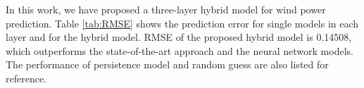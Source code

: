 \documentclass[conference]{IEEEtran}
\begin{document}
In this work, we have proposed a three-layer hybrid model for wind power prediction. Table \ref{tab:RMSE} shows the prediction error for single models in each layer and for the hybrid model. RMSE of the proposed hybrid model is 0.14508, which outperforms the state-of-the-art approach and the neural network models. The performance of persistence model and random guess are also listed for reference.

\begin{table}
\caption {Prediction Error in RMSE for Comparison.}
\begin{center}
\end{center}
\end{table}
\end{document}
